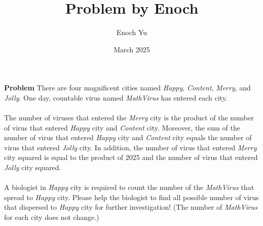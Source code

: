 \documentclass[12pt]{article}
\title{Problem by Enoch}
\author{Enoch Yu}
\date{March 2025}
\begin{document}
\textbf{Problem} There are four magnificent cities named \textit{Happy}, \textit{Content}, \textit{Merry}, and \textit{Jolly}. One day, countable virus named \textit{MathVirus} has entered each city.
\\\\
The number of viruses that entered the \textit{Merry} city is the product of the number of virus that entered \textit{Happy} city and \textit{Content} city. Moreover, the sum of the number of virus that entered \textit{Happy} city and \textit{Content} city equals the number of virus that entered \textit{Jolly} city. In addition, the number of virus that entered \textit{Merry} city squared is equal to the product of 2025 and the number of virus that entered \textit{Jolly} city squared.
\\\\
A biologist in \textit{Happy} city is required to count the number of the \textit{MathVirus} that spread to \textit{Happy} city. Please help the biologist to find all possible number of virus that dispersed to \textit{Happy} city for further investigation! (The number of \textit{MathVirus} for each city does not change.)

\newpage
\end{document}
